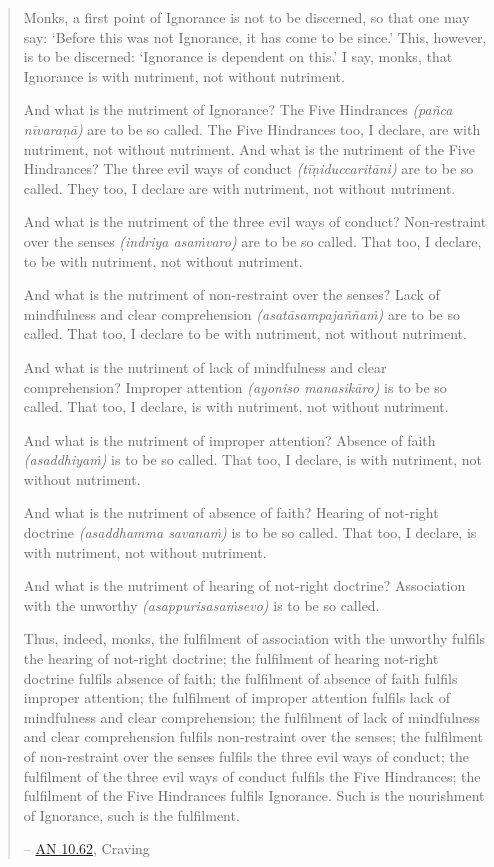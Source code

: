 \begin{quote}
Monks, a first point of Ignorance is not to be discerned, so that one may say: `Before this was not Ignorance, it has come to be since.' This, however, is to be discerned: `Ignorance is dependent on this.' I say, monks, that Ignorance is with nutriment, not without nutriment.

And what is the nutriment of Ignorance? The Five Hindrances \emph{(pañca nīvaraṇā)} are to be so called. The Five Hindrances too, I declare, are with nutriment, not without nutriment. And what is the nutriment of the Five Hindrances? The three evil ways of conduct \emph{(tīṇiduccaritāni)} are to be so called. They too, I declare are with nutriment, not without nutriment.

And what is the nutriment of the three evil ways of conduct? Non-restraint over the senses \emph{(indriya asaṁvaro)} are to be so called. That too, I declare, to be with nutriment, not without nutriment.

And what is the nutriment of non-restraint over the senses? Lack of mindfulness and clear comprehension \emph{(asatāsampajaññaṁ)} are to be so called. That too, I declare to be with nutriment, not without nutriment.

And what is the nutriment of lack of mindfulness and clear comprehension? Improper attention \emph{(ayoniso manasikāro)} is to be so called. That too, I declare, is with nutriment, not without nutriment.

And what is the nutriment of improper attention? Absence of faith \emph{(asaddhiyaṁ)} is to be so called. That too, I declare, is with nutriment, not without nutriment.

And what is the nutriment of absence of faith? Hearing of not-right doctrine \emph{(asaddhamma savanaṁ)} is to be so called. That too, I declare, is with nutriment, not without nutriment.

And what is the nutriment of hearing of not-right doctrine? Association with the unworthy \emph{(asappurisasaṁsevo)} is to be so called.

Thus, indeed, monks, the fulfilment of association with the unworthy fulfils the hearing of not-right doctrine; the fulfilment of hearing not-right doctrine fulfils absence of faith; the fulfilment of absence of faith fulfils improper attention; the fulfilment of improper attention fulfils lack of mindfulness and clear comprehension; the fulfilment of lack of mindfulness and clear comprehension fulfils non-restraint over the senses; the fulfilment of non-restraint over the senses fulfils the three evil ways of conduct; the fulfilment of the three evil ways of conduct fulfils the Five Hindrances; the fulfilment of the Five Hindrances fulfils Ignorance. Such is the nourishment of Ignorance, such is the fulfilment.

 -- \href{https://suttacentral.net/an10.62/en/bodhi}{AN 10.62}, Craving
\end{quote}

